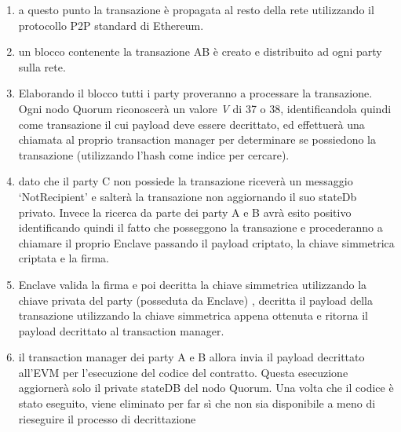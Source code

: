 \begin{enumerate}
	\item a questo punto la transazione è propagata al resto della rete utilizzando il protocollo P2P standard di Ethereum.
	\item un blocco contenente la transazione AB è creato e distribuito ad ogni party sulla rete.
	\item Elaborando il blocco tutti i party proveranno a processare la transazione. Ogni nodo Quorum riconoscerà un valore \emph{V} di 37 o 38, identificandola quindi come transazione il cui payload deve essere decrittato, ed effettuerà una chiamata al proprio transaction manager per determinare se possiedono la transazione (utilizzando l'hash come indice per cercare).
	\item dato che il party C non possiede la transazione riceverà un messaggio \enquote*{NotRecipient} e salterà la transazione non aggiornando il suo stateDb privato. Invece la ricerca da parte dei party A e B avrà esito positivo identificando quindi il fatto che posseggono la transazione e procederanno a chiamare il proprio Enclave passando il payload criptato, la chiave simmetrica criptata e la firma.
	\item Enclave valida la firma e poi decritta la chiave simmetrica utilizzando la chiave privata del party (posseduta da Enclave) , decritta il payload della transazione utilizzando la chiave simmetrica appena ottenuta e ritorna il payload decrittato al transaction manager.
	\item il transaction manager dei party A e B allora invia il payload decrittato all'EVM per l'esecuzione del codice del contratto. Questa esecuzione aggiornerà solo il private stateDB del nodo Quorum. Una volta che il codice è stato eseguito, viene eliminato per far sì che non sia disponibile a meno di rieseguire il processo di decrittazione
\end{enumerate}